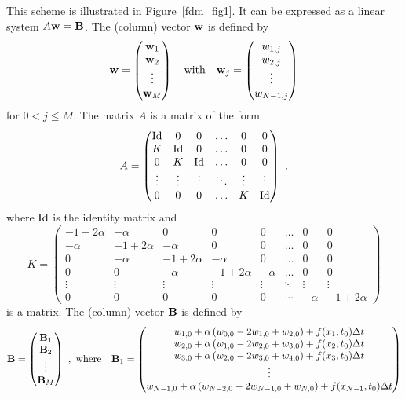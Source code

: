 This scheme is illustrated in Figure~\ref{fdm_fig1}.  It can be
expressed as a linear system $A \mathbf{w} = \mathbf{B}$.  The (column)
vector $\mathbf{w}$ is defined by
\[ \mathbf{w} = \begin{pmatrix} \mathbf{w}_1 \\ \mathbf{w}_2 \\ \vdots \\
\mathbf{w}_{M}
\end{pmatrix} \quad \text{with} \quad \mathbf{w}_j =
\begin{pmatrix} w_{1,j} \\ w_{2,j} \\ \vdots \\
w_{N-1,j} \end{pmatrix}
\]
for $0 <j \leq M$. The matrix $A$ is
a  matrix of the form 
\[
A = \begin{pmatrix}
\operatorname{Id} & 0 & 0 & \ldots & 0 & 0 \\
K & \operatorname{Id} & 0 & \ldots & 0 & 0 \\
0 & K & \operatorname{Id} & \ldots & 0 & 0 \\
\vdots & \vdots & \vdots & \ddots & \vdots & \vdots \\
0 & 0 & 0 & \ldots & K & \operatorname{Id}
\end{pmatrix} \ ,
\]
where $\operatorname{Id}$ is the  identity matrix and
\begin{equation} \label{fdm_K}
K = \begin{pmatrix}
-1+2\alpha & -\alpha & 0 & 0 & 0 & \ldots & 0 & 0 \\
-\alpha & -1 +2\alpha & -\alpha & 0 & 0 & \ldots & 0 & 0  \\
0 & -\alpha & -1 +2\alpha & -\alpha & 0 & \ldots & 0 & 0 \\
0 & 0 & -\alpha & -1 +2\alpha & -\alpha & \ldots & 0 & 0 \\
\vdots & \vdots & \vdots & \vdots & \vdots & \ddots & \vdots & \vdots \\
0 & 0 & 0 & 0 & 0 & \cdots & -\alpha & -1+2\alpha
\end{pmatrix}
\end{equation}
is a  matrix.  The (column) vector $\mathbf{B}$ is defined by
\[
\mathbf{B} = \begin{pmatrix} \mathbf{B}_1 \\ \mathbf{B}_2 \\ \vdots \\
\mathbf{B}_M \end{pmatrix} \ , \ \text{where} \quad
\mathbf{B}_1 = \begin{pmatrix} 
w_{1,0} + \alpha \left( w_{0,0} - 2 w_{1,0} + w_{2,0}\right)
+ f(x_1,t_0) \Delta{t} \\
w_{2,0} + \alpha \left( w_{1,0} - 2 w_{2,0} + w_{3,0}\right)
+ f(x_2,t_0) \Delta{t} \\
w_{3,0} + \alpha \left( w_{2,0} - 2 w_{3,0} + w_{4,0}\right)
+ f(x_3,t_0) \Delta{t} \\
\vdots \\
w_{N-1,0} + \alpha \left( w_{N-2,0} - 2 w_{N-1,0} + w_{N,0}\right)
+ f(x_{N-1},t_0) \Delta{t}
\end{pmatrix}
\]
